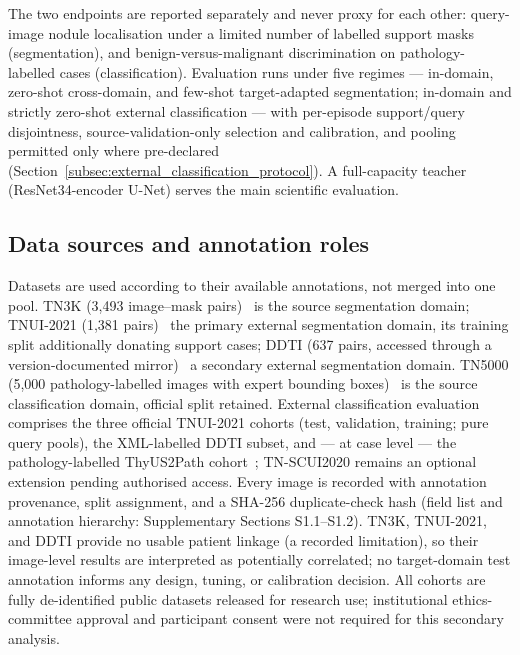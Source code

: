 \documentclass[jimh,article,submit,moreauthors,pdftex]{Definitions/tsp}
\begin{document}
The two endpoints are reported separately and never proxy for each
other: query-image nodule localisation under a limited number of
labelled support masks (segmentation), and benign-versus-malignant
discrimination on pathology-labelled cases (classification). Evaluation
runs under five regimes --- in-domain, zero-shot cross-domain, and
few-shot target-adapted segmentation; in-domain and strictly zero-shot
external classification --- with per-episode support/query
disjointness, source-validation-only selection and calibration, and
pooling permitted only where pre-declared
(Section~\ref{subsec:external_classification_protocol}). A
full-capacity teacher (ResNet34-encoder U-Net) serves the main
scientific evaluation.

\subsection{Data sources and annotation roles}
\label{subsec:data_sources}

Datasets are used according to their available annotations, not merged
into one pool. TN3K (3,493 image--mask
pairs)~\cite{rev_gong2021tn3k,ds_tn3k} is the source segmentation
domain; TNUI-2021 (1,381 pairs)~\cite{ds_tnui2021} the primary external
segmentation
domain, its training split additionally donating support cases; DDTI
(637 pairs, accessed through a version-documented
mirror)~\cite{rev_pedraza2015ddti,ds_ddti} a secondary
external segmentation domain. TN5000 (5,000 pathology-labelled images
with expert bounding boxes)~\cite{rev_zhang2025tn5000,ds_tn5000} is
the source classification domain,
official split retained. External classification evaluation comprises
the three official TNUI-2021 cohorts (test, validation, training; pure
query pools), the XML-labelled DDTI subset, and --- at case level ---
the pathology-labelled ThyUS2Path
cohort~\cite{rev_hou2024thyus2path,ds_thyus2path}; TN-SCUI2020 remains an
optional extension pending authorised access. Every image is recorded
with annotation provenance, split assignment, and a SHA-256
duplicate-check hash (field list and annotation hierarchy:
Supplementary Sections S1.1--S1.2). TN3K, TNUI-2021, and DDTI provide
no usable patient linkage (a recorded limitation), so their image-level
results are interpreted as potentially correlated; no target-domain
test annotation informs any design, tuning, or calibration decision.
All cohorts are fully de-identified public datasets released for
research use; institutional ethics-committee approval and participant
consent were not required for this secondary analysis.
\end{document}
